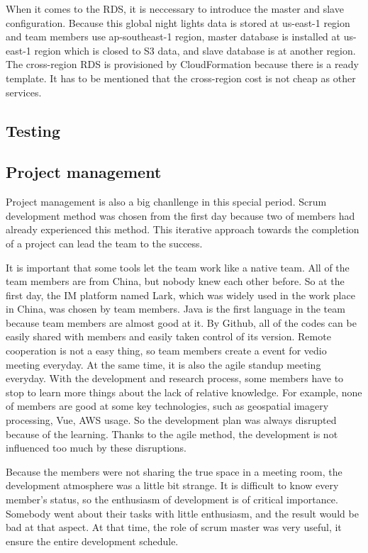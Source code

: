 \documentclass[conference]{IEEEtran}
\begin{document}
When it comes to the RDS, it is neccessary to introduce the master and slave configuration. Because this global night lights data is stored at us-east-1 region and team members 
use ap-southeast-1 region, master database is installed at us-east-1 region which is closed to S3 data, and slave database is at another region. The cross-region RDS is 
provisioned by CloudFormation because there is a ready template. It has to be mentioned that the cross-region cost is not cheap as other services.


\subsection{Testing}

\subsection{Project management}
Project management is also a big chanllenge in this special period. Scrum development method was chosen from the first day because two of members
had already experienced this method. This iterative approach towards the completion of a project can lead the team to the success.

It is important that some tools let the team work like a native team. All of the team members are from China, but nobody knew each other before. 
So at the first day, the IM platform named Lark, which was widely used in the work place in China, was chosen by team members. Java is the first 
language in the team because team members are almost good at it. By Github, all of the codes can be easily shared with members and easily taken 
control of its version. Remote cooperation is not a easy thing, so team members create a event for vedio meeting everyday. At the same time, it 
is also the agile standup meeting everyday. With the development and research process, some members have to stop to learn more things about the 
lack of relative knowledge. For example, none of members are good at some key technologies, such as geospatial imagery processing, Vue, AWS usage. 
So the development plan was always disrupted because of the learning. Thanks to the agile method, the development is not influenced too much by 
these disruptions. 

Because the members were not sharing the true space in a meeting room, the development atmosphere was a little bit strange. It is difficult to know 
every member's status, so the enthusiasm of development is of critical importance. Somebody went about their tasks with little enthusiasm, and the 
result would be bad at that aspect. At that time, the role of scrum master was very useful, it ensure the entire development schedule.
\end{document}
